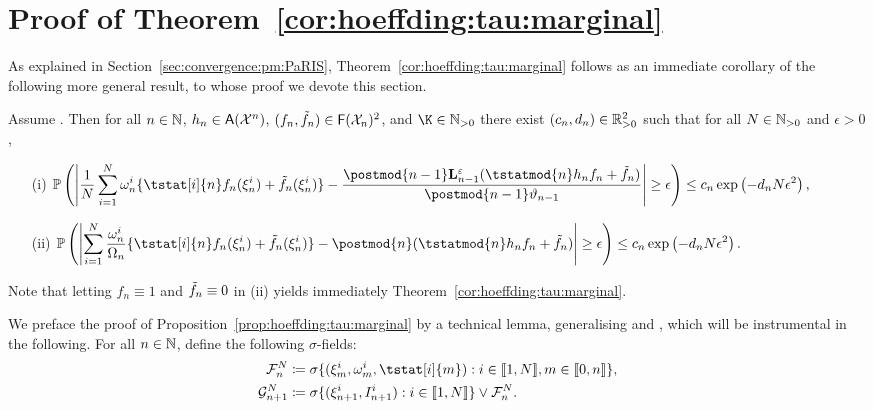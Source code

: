

\section{Proof of Theorem~\ref{cor:hoeffding:tau:marginal}}
\label{sec:proof:prop:hoeffding:tau:marginal}

As explained in Section~\ref{sec:convergence:pm:PaRIS}, 
Theorem~\ref{cor:hoeffding:tau:marginal} follows as an immediate corollary of the following more general result, to whose proof we devote this section. 

\begin{proposition}
\label{prop:hoeffding:tau:marginal}
Assume . Then for all $n \in \mathbb{N}$, $h_n \in \mathsf{A}(\mathcal{X}^n)$, $(f_n, \tilde{f}_{n}) \in \mathsf{F}(\mathcal{X}_n)^2$, and $\K \in \nsetpos$ there exist $(c_n, d_n) \in \mathbb{R}_{> 0}^2$ such that for all $N \in \mathbb{N}_{> 0}$ and $\epsilon > 0$,
\begin{itemize}
\item[(i)] 
$ \displaystyle
\pP\left(\left| \frac{1}{\N} \sum_{i = 1}^\N \ewght{n}{i} \{\tstat[i]{n} f_n(\epart{n}{i}) + \ftd{n}(\epart{n}{i})\} - \frac{\postmod{n - 1} \ukmod{n - 1} ( \tstatmod{n} h_n f_n + \tilde{f}_n )}{\postmod{n - 1} \adjfuncforward{n - 1}} \right| \geq \epsilon \right) \leq c_n \exp \left( - d_n \N \epsilon^2 \right),
$
\item[(ii)] 
$ \displaystyle
\pP\left(\left| \sum_{i = 1}^\N \frac{\ewght{n}{i}}{\sumwght{n}} \{\tstat[i]{n} f_n(\epart{n}{i}) + \tilde{f}_n(\epart{n}{i})\} - \postmod{n} ( \tstatmod{n} h_n f_n + \tilde{f}_n ) \right| \geq \epsilon \right) \leq c_n \exp \left( - d_n \N \epsilon^2 \right).
$
\end{itemize}
\end{proposition}

Note that letting $f_n \equiv 1$ and $\tilde{f}_{n} \equiv 0$ in (ii) yields immediately Theorem~\ref{cor:hoeffding:tau:marginal}. 

We preface the proof of Proposition~\ref{prop:hoeffding:tau:marginal} by a technical lemma, generalising \cite[Lemma~12]{olsson:westerborn:2014b} and \cite[Lemma~2]{gloaguen2018online}, which will be instrumental in the following. For all $n \in \mathbb{N}$, define the following $\sigma$-fields:
\begin{align*}
\calF{n}{\N} &\eqdef \sigma \{ (\epart{m}{i}, \ewght{m}{i}, \tstat[i]{m}) : i \in \intvect{1}{\N}, m \in \intvect{0}{n} \}, \\
\calG{n + 1}{\N} &\eqdef \sigma \{(\epart{n + 1}{i}, \ind{n + 1}{i}) : i \in \intvect{1}{\N} \} \vee \calF{n}{\N}. 
\end{align*}

